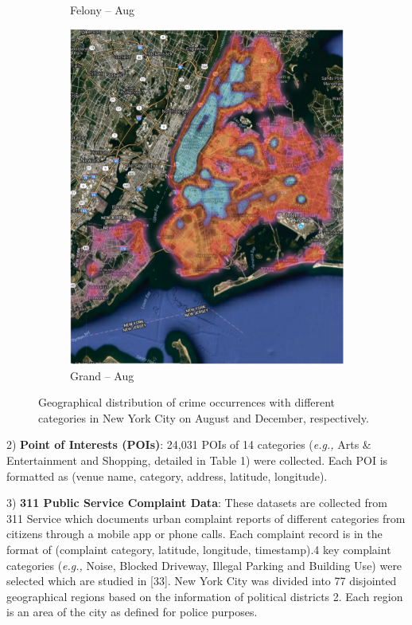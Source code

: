 \begin{figure}[t]
\begin{subfigure}{0.24\textwidth}
        \caption{Felony – Aug}
        \label{fig:subim3}
    \end{subfigure}
    \begin{subfigure}{0.24\textwidth}
        \centering
        \includegraphics[width=0.9\linewidth]{Chapter5/Images/grand.png}
        \caption{Grand – Aug}
        \label{fig:subim4}
    \end{subfigure}
 
    \caption{Geographical distribution of crime occurrences with different categories in New York City on August and December,
    respectively.}
    \label{fig:img2}
\end{figure}

2) \textbf{Point of Interests (POIs)}: 24,031 POIs of 14
categories (\emph{e.g.,} Arts \& Entertainment and Shopping, detailed in
Table 1) were collected. Each POI is formatted as (venue name, category, address, latitude, longitude).

3) \textbf{311 Public Service Complaint Data}: These datasets are collected from 311 Service which documents urban complaint reports
of different categories from citizens through a mobile app or phone
calls. Each complaint record is in the format of (complaint category,
latitude, longitude, timestamp).4 key complaint categories (\emph{e.g.,} Noise, Blocked Driveway, Illegal Parking and Building
Use) were selected which are studied in [33].
New York City was divided into 77 disjointed geographical regions based on the information of political districts 2. Each region
is an area of the city as defined for police purposes.

